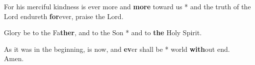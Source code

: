 \begin{multicols}{2}
	For his merciful kindness is ever more and \textbf{more} toward us * and the truth of the Lord endureth \textbf{for}ever, praise the Lord.
	
	Glory be to the Fa\textbf{ther}, and to the Son * and to \textbf{the} Holy Spirit.
	
	As it was in the beginning, is now, and \textbf{ev}er shall be * world \textbf{with}out end. Amen.
\end{multicols}